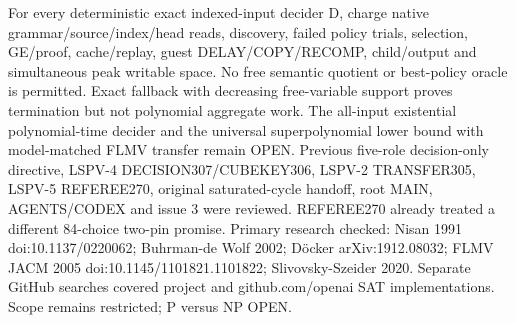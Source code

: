 \documentclass{article}
\begin{document}
For every deterministic exact indexed-input decider D, charge native grammar/source/index/head reads, discovery, failed policy trials, selection, GE/proof, cache/replay, guest DELAY/COPY/RECOMP, child/output and simultaneous peak writable space. No free semantic quotient or best-policy oracle is permitted. Exact fallback with decreasing free-variable support proves termination but not polynomial aggregate work. The all-input existential polynomial-time decider and the universal superpolynomial lower bound with model-matched FLMV transfer remain OPEN.
Previous five-role decision-only directive, LSPV-4 DECISION307/CUBEKEY306, LSPV-2 TRANSFER305, LSPV-5 REFEREE270, original saturated-cycle handoff, root MAIN, AGENTS/CODEX and issue 3 were reviewed. REFEREE270 already treated a different 84-choice two-pin promise. Primary research checked: Nisan 1991 doi:10.1137/0220062; Buhrman-de Wolf 2002; D\"ocker arXiv:1912.08032; FLMV JACM 2005 doi:10.1145/1101821.1101822; Slivovsky-Szeider 2020. Separate GitHub searches covered project and github.com/openai SAT implementations. Scope remains restricted; P versus NP OPEN.
\end{document}
